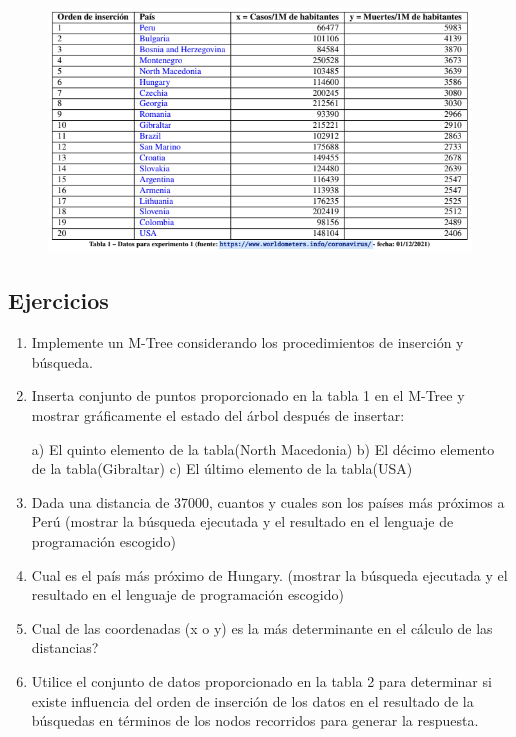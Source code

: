 \documentclass[a4paper]{article}
\begin{document}
\begin{figure}[H]
  \centering
  \includegraphics[width=1\textwidth]{imagenes/Captura de pantalla de 2021-12-15 13-58-05.png}
\end{figure}





\subsection{Ejercicios}



\begin{enumerate}
\item  Implemente un M-Tree considerando los procedimientos de inserción y búsqueda.


\item  Inserta conjunto de puntos proporcionado en la tabla 1 en el M-Tree y mostrar gráficamente el estado del árbol después de
insertar:

a) El quinto elemento de la tabla(North Macedonia)
b) El décimo elemento de la tabla(Gibraltar)
c) El último elemento de la tabla(USA)

\item Dada una distancia de 37000, cuantos y cuales son los países más próximos a Perú (mostrar la búsqueda ejecutada y el
resultado en el lenguaje de programación escogido)


\item Cual es el país más próximo de Hungary. (mostrar la búsqueda ejecutada y el resultado en el lenguaje de programación
escogido)


\item Cual de las coordenadas (x o y) es la más determinante en el cálculo de las distancias?


\item Utilice el conjunto de datos proporcionado en la tabla 2 para determinar si existe influencia del orden de inserción de los
datos en el resultado de la búsquedas en términos de los nodos recorridos para generar la respuesta.



\end{enumerate}
\end{document}
